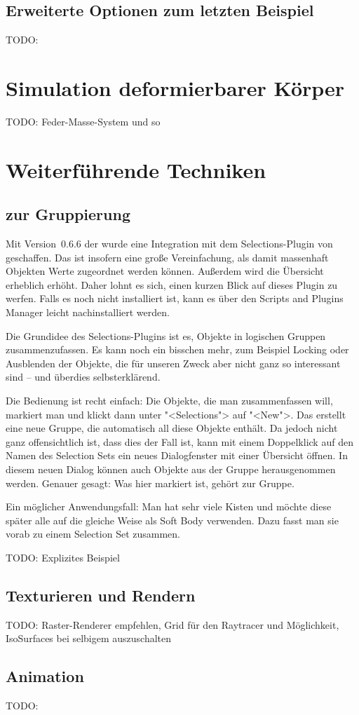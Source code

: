 \documentclass[10pt,DIV=14,a4paper]{scrartcl}
\begin{document}
\subsection{Erweiterte Optionen zum letzten Beispiel}
TODO:



\pagebreak
\section{Simulation deformierbarer Körper}
TODO: Feder-Masse-System und so


\pagebreak
\section{Weiterführende Techniken}

\subsection{ zur Gruppierung}
Mit Version~0.6.6 der \fluidsim wurde eine Integration mit dem
Selections-Plugin von \aoi geschaffen. Das ist insofern eine große
Vereinfachung, als damit massenhaft Objekten Werte zugeordnet werden
können. Außerdem wird die Übersicht erheblich erhöht. Daher lohnt es
sich, einen kurzen Blick auf dieses Plugin zu werfen. Falls es noch
nicht installiert ist, kann es über den Scripts and Plugins Manager
leicht nachinstalliert werden.

Die Grundidee des Selections-Plugins ist es, Objekte in logischen
Gruppen zusammenzufassen. Es kann noch ein bisschen mehr, zum Beispiel
Locking oder Ausblenden der Objekte, die für unseren Zweck aber nicht
ganz so interessant sind -- und überdies selbst\-er\-klä\-rend.

Die Bedienung ist recht einfach: Die Objekte, die man zusammenfassen
will, markiert man und klickt dann unter "<Selections"> auf "<New">. Das
erstellt eine neue Gruppe, die automatisch all diese Objekte enthält. Da
jedoch nicht ganz offensichtlich ist, dass dies der Fall ist, kann mit
einem Doppelklick auf den Namen des Selection Sets ein neues
Dialogfenster mit einer Übersicht öffnen. In diesem neuen Dialog können
auch Objekte aus der Gruppe herausgenommen werden. Genauer gesagt: Was
hier markiert ist, gehört zur Gruppe.

Ein möglicher Anwendungsfall: Man hat sehr viele Kisten und möchte diese
später alle auf die gleiche Weise als Soft Body verwenden. Dazu fasst
man sie vorab zu einem Selection Set zusammen.

TODO: Explizites Beispiel

\subsection{Texturieren und Rendern}
TODO: Raster-Renderer empfehlen, Grid für den Raytracer und Möglichkeit,
IsoSurfaces bei selbigem auszuschalten

\subsection{Animation}
TODO:

\end{document}
